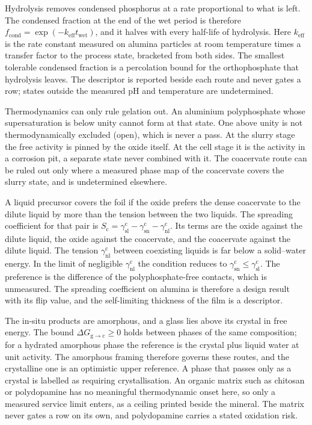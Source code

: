 Hydrolysis removes condensed phosphorus at a rate proportional to what is left. %
The condensed fraction at the end of the wet period is therefore $f_\mathrm{cond}=\exp(-k_\mathrm{eff}t_\mathrm{wet})$, and it halves with every half-life of hydrolysis. %
Here $k_\mathrm{eff}$ is the rate constant measured on alumina particles at room temperature\cite{wan2019polyphosphate} times a transfer factor to the process state, bracketed from both sides. %
The smallest tolerable condensed fraction is a percolation bound for the orthophosphate that hydrolysis leaves. %
The descriptor is reported beside each route and never gates a row; states outside the measured pH and temperature are undetermined. %

Thermodynamics can only rule gelation out. %
An aluminium polyphosphate whose supersaturation is below unity cannot form at that state. %
One above unity is not thermodynamically excluded (open), which is never a pass. %
At the slurry stage the free  activity is pinned by the oxide itself. %
At the cell stage it is the activity in a corrosion pit, a separate state never combined with it. %
The coacervate route can be ruled out only where a measured phase map of the coacervate covers the slurry state, and is undetermined elsewhere. %

A liquid precursor covers the foil if the oxide prefers the dense coacervate to the dilute liquid by more than the tension between the two liquids. %
The spreading coefficient for that pair is $S_\mathrm{c}=\gamma_\mathrm{sl}^\mathrm{c}-\gamma_\mathrm{sn}^\mathrm{c}-\gamma_\mathrm{nl}^\mathrm{c}$. %
Its terms are the oxide against the dilute liquid, the oxide against the coacervate, and the coacervate against the dilute liquid. %
The tension $\gamma_\mathrm{nl}^\mathrm{c}$ between coexisting liquids is far below a solid--water energy. %
In the limit of negligible $\gamma_\mathrm{nl}^\mathrm{c}$ the condition reduces to $\gamma_\mathrm{sn}^\mathrm{c}\le\gamma_\mathrm{sl}^\mathrm{c}$. %
The preference is the difference of the polyphosphate-free contacts, which is unmeasured. %
The spreading coefficient on alumina is therefore a design result with its flip value, and the self-limiting thickness of the film is a descriptor. %

The in-situ products are amorphous, and a glass lies above its crystal in free energy. %
The bound $\Delta G_{\mathrm{g}\to\mathrm{c}}\ge0$ holds between phases of the same composition; for a hydrated amorphous phase the reference is the crystal plus liquid water at unit activity. %
The amorphous framing therefore governs these routes, and the crystalline one is an optimistic upper reference. %
A phase that passes only as a crystal is labelled as requiring crystallisation. %
An organic matrix such as chitosan or polydopamine has no meaningful thermodynamic onset here, so only a measured service limit enters, as a ceiling printed beside the mineral. %
The matrix never gates a row on its own, and polydopamine carries a stated oxidation risk. %
